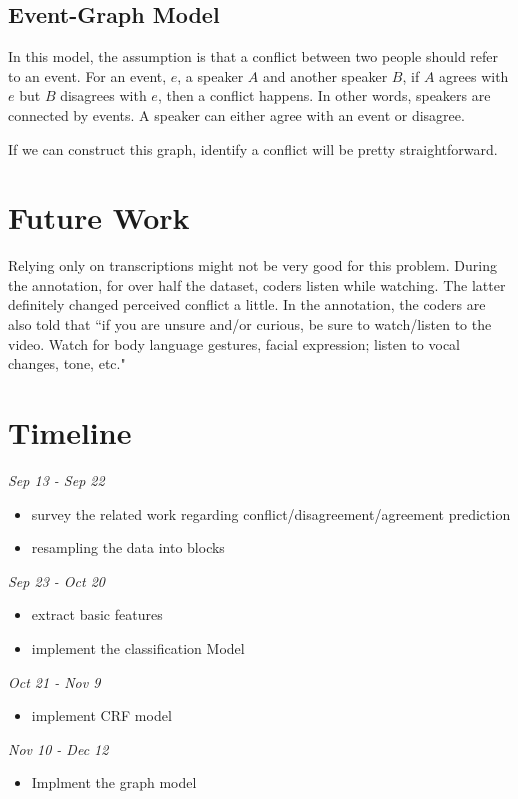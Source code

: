 \documentclass[11pt,letterpaper]{article}
\begin{document}
\subsection{Event-Graph Model}
In this model, the assumption is that a conflict between two people should refer to an event. For an event, $e$, a speaker $A$ and another speaker $B$, if $A$ agrees with $e$ but $B$ disagrees with $e$, then a conflict happens. In other words, speakers are connected by events. A speaker can either agree with an event or disagree.

If we can construct this graph, identify a conflict will be pretty straightforward.

\section{Future Work}
Relying only on transcriptions might not be very good for this problem. During the annotation, for over half the dataset, coders listen while watching. The latter definitely changed perceived conflict a little. In the annotation, the coders are also told that ``if you are unsure and/or curious, be sure to watch/listen to the video. Watch for body language gestures, facial expression; listen to vocal changes, tone, etc."

\section{Timeline}

\noindent \emph{Sep 13 - Sep 22}
\begin{itemize}
  \item survey the related work regarding conflict/disagreement/agreement prediction
  \item resampling the data into blocks
\end{itemize}

\noindent \emph{Sep 23 -  Oct 20}
\begin{itemize}
  \item extract basic features
  \item implement the classification Model
\end{itemize}

\noindent \emph{Oct 21 - Nov 9}
\begin{itemize}
  \item implement CRF model
\end{itemize}

\noindent \emph{Nov 10 - Dec 12}
\begin{itemize}
  \item Implment the graph model
\end{itemize}
\end{document}
